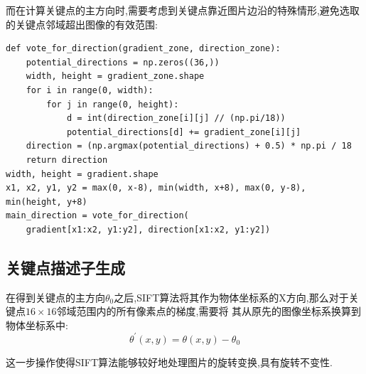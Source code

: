 \documentclass[a4paper]{article}
\begin{document}
而在计算关键点的主方向时,需要考虑到关键点靠近图片边沿的特殊情形,避免选取的关键点邻域超出图像的有效范围:
\begin{verbatim}
def vote_for_direction(gradient_zone, direction_zone):
    potential_directions = np.zeros((36,))
    width, height = gradient_zone.shape
    for i in range(0, width):
        for j in range(0, height):
            d = int(direction_zone[i][j] // (np.pi/18))
            potential_directions[d] += gradient_zone[i][j]
    direction = (np.argmax(potential_directions) + 0.5) * np.pi / 18
    return direction
width, height = gradient.shape
x1, x2, y1, y2 = max(0, x-8), min(width, x+8), max(0, y-8), min(height, y+8)
main_direction = vote_for_direction(
    gradient[x1:x2, y1:y2], direction[x1:x2, y1:y2])
\end{verbatim}
        \subsection{关键点描述子生成}
在得到关键点的主方向$\theta_0$之后,SIFT算法将其作为物体坐标系的X方向,那么对于关键点$16\times16$邻域范围内的所有像素点的梯度,需要将
其从原先的图像坐标系换算到物体坐标系中:
$$\theta^{'}(x,y) = \theta(x,y) - \theta_0$$

这一步操作使得SIFT算法能够较好地处理图片的旋转变换,具有旋转不变性.
\end{document}
